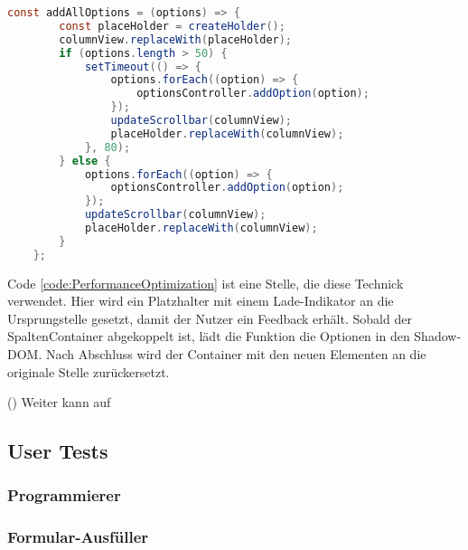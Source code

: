 \begin{lstlisting}[language = java, caption = Code: Performance Optimierung (columnOptionsComponent.js), label = code:PerformanceOptimization]
    const addAllOptions = (options) => {
        const placeHolder = createHolder();
        columnView.replaceWith(placeHolder);
        if (options.length > 50) {
            setTimeout(() => {
                options.forEach((option) => {
                    optionsController.addOption(option);
                });
                updateScrollbar(columnView);
                placeHolder.replaceWith(columnView);
            }, 80);
        } else {
            options.forEach((option) => {
                optionsController.addOption(option);
            });
            updateScrollbar(columnView);
            placeHolder.replaceWith(columnView);
        }
    };
\end{lstlisting}
Code \ref{code:PerformanceOptimization} ist eine Stelle, die diese Technick verwendet.
Hier wird ein Platzhalter mit einem Lade-Indikator an die Ursprungstelle gesetzt, damit der Nutzer ein Feedback erhält.
Sobald der SpaltenContainer abgekoppelt ist, lädt die Funktion die Optionen in den Shadow-DOM.
Nach Abschluss wird der Container mit den neuen Elementen an die originale Stelle zurückersetzt.

(\cite{efficientDomManipulation}) Weiter kann auf 

\subsection{User Tests}


\subsubsection{Programmierer}



\subsubsection{Formular-Ausfüller}




